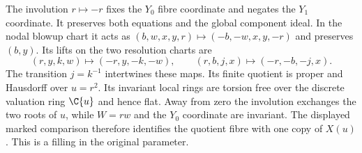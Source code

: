 \item The involution $r\mapsto-r$ fixes the $Y_0$ fibre coordinate and negates the $Y_1$ coordinate. It preserves both equations and the global component ideal. In the nodal blowup chart it acts as $(b,w,x,y,r)\mapsto(-b,-w,x,y,-r)$ and preserves $(b,y)$. Its lifts on the two resolution charts are
\[
 (r,y,k,w)\longmapsto(-r,y,-k,-w),\qquad
 (r,b,j,x)\longmapsto(-r,-b,-j,x).
\]
The transition $j=k^{-1}$ intertwines these maps. Its finite quotient is proper and Hausdorff over $u=r^2$. Its invariant local rings are torsion free over the discrete valuation ring $\C\{u\}$ and hence flat. Away from zero the involution exchanges the two roots of $u$, while $W=rw$ and the $Y_0$ coordinate are invariant. The displayed marked comparison therefore identifies the quotient fibre with one copy of $X(u)$. This is a filling in the original parameter.

